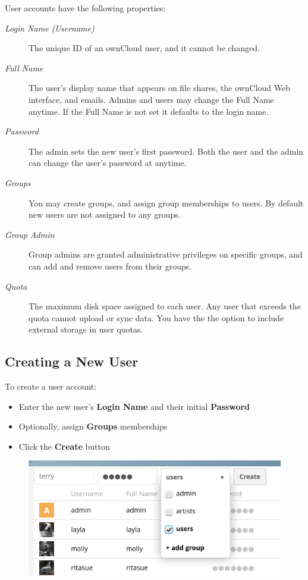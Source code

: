\documentclass[letterpaper,10pt,english]{sphinxmanual}
\begin{document}
User accounts have the following properties:
\begin{description}
\item[{\emph{Login Name (Username)}}] \leavevmode
The unique ID of an ownCloud user, and it cannot be changed.

\item[{\emph{Full Name}}] \leavevmode
The user's display name that appears on file shares, the ownCloud Web
interface, and emails. Admins and users may change the Full Name anytime. If
the Full Name is not set it defaults to the login name.

\item[{\emph{Password}}] \leavevmode
The admin sets the new user's first password. Both the user and the admin can
change the user's password at anytime.

\item[{\emph{Groups}}] \leavevmode
You may create groups, and assign group memberships to users. By default new
users are not assigned to any groups.

\item[{\emph{Group Admin}}] \leavevmode
Group admins are granted administrative privileges on specific groups, and
can add and remove users from their groups.

\item[{\emph{Quota}}] \leavevmode
The maximum disk space assigned to each user. Any user that exceeds the quota
cannot upload or sync data. You have the the option to include external
storage in user quotas.

\end{description}


\subsection{Creating a New User}
\label{configuration_user/user_configuration:creating-a-new-user}
To create a user account:
\begin{itemize}
\item {} 
Enter the new user's \textbf{Login Name} and their initial \textbf{Password}

\item {} 
Optionally, assign \textbf{Groups} memberships

\item {} 
Click the \textbf{Create} button

\end{itemize}
\begin{figure}[htbp]
\centering

\includegraphics{users-create.png}
\end{figure}
\end{document}
